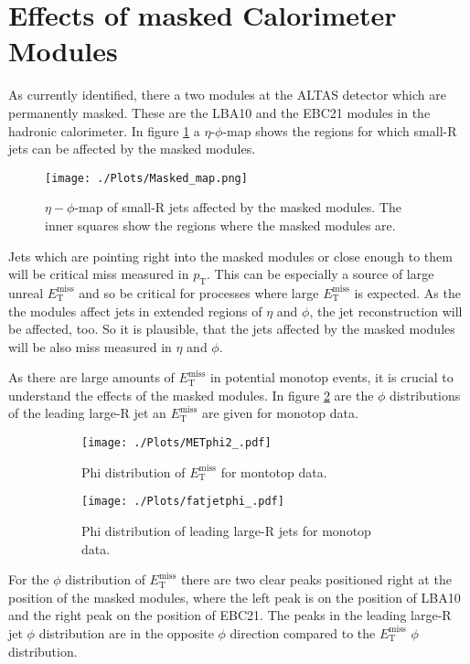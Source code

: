 \section{Effects of masked Calorimeter Modules}
As currently identified, there a two modules at the ALTAS detector which are permanently masked.
These are the LBA10 and the EBC21 modules in the hadronic calorimeter.
In figure \ref{masked_modules} a $\eta$-$\phi$-map shows the regions for which small-R jets can be affected by the masked modules.
\begin{figure}[H]
	\centering
	\texttt{[image: ./Plots/Masked\_map.png]}
	\caption{$\eta-\phi$-map of small-R jets affected by the masked modules. The inner squares show the regions where the masked modules are.\cite{RodriguezPerez:2126928}}
	\label{masked_modules}
\end{figure}
Jets which are pointing right into the masked modules or close enough to them will be critical miss measured in $p_{\text{T}}$.
This can be especially a source of large unreal $E_{\mathrm{T}}^{\mathrm{miss}}$ and so be critical for processes where large $E_{\mathrm{T}}^{\mathrm{miss}}$ is expected.
As the the modules affect jets in extended regions of $\eta$ and $\phi$, the jet reconstruction will be affected, too.
So it is plausible, that the jets affected by the masked modules will be also miss measured in $\eta$ and $\phi$.

As there are large amounts of $E_{\mathrm{T}}^{\mathrm{miss}}$ in potential monotop events, it is crucial to understand the effects of the masked modules. 
In figure \ref{Phi} are the $\phi$ distributions of the leading large-R jet an $E_{\mathrm{T}}^{\mathrm{miss}}$ are given for monotop data.
\begin{figure}
	\centering
	\begin{subfigure}{0.45\textwidth}
		\texttt{[image: ./Plots/METphi2\_.pdf]}
		\caption{Phi distribution of $E_{\mathrm{T}}^{\mathrm{miss}}$ for montotop data.}
	\end{subfigure}
	\begin{subfigure}{0.45\textwidth}
		\texttt{[image: ./Plots/fatjetphi\_.pdf]}
		\caption{Phi distribution of leading large-R jets for monotop data.}
	\end{subfigure}
	\caption{}\label{Phi}
\end{figure}
For the $\phi$ distribution of $E_{\mathrm{T}}^{\mathrm{miss}}$ there are two clear peaks positioned right at the position of the masked modules, where the left peak is on the position of LBA10 and the right peak on the position of EBC21.
The peaks in the leading large-R jet $\phi$ distribution are in the opposite $\phi$ direction compared to the $E_{\mathrm{T}}^{\mathrm{miss}}$ $\phi$ distribution. 

